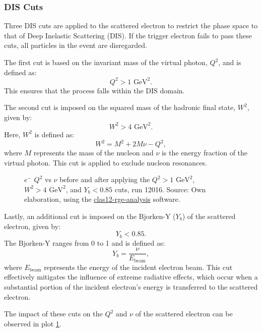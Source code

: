 \subsubsection{DIS Cuts}
\label{13.23::dis_cuts}
    Three DIS cuts are applied to the scattered electron to restrict the phase space to that of Deep Inelastic Scattering (DIS).
    If the trigger electron fails to pass these cuts, all particles in the event are disregarded.

    The first cut is based on the invariant mass of the virtual photon, $Q^2$, and is defined as:
    \begin{equation*}
        Q^2 > 1 \text{ GeV}^2.
    \end{equation*}
    This ensures that the process falls within the DIS domain.

    The second cut is imposed on the squared mass of the hadronic final state, $W^2$, given by:
    \begin{equation*}
        W^2 > 4 \text{ GeV}^2.
    \end{equation*}
    Here, $W^2$ is defined as:
    \begin{equation*}
        W^2 = M^2 + 2M\nu - Q^2,
    \end{equation*}
    where $M$ represents the mass of the nucleon and $\nu$ is the energy fraction of the virtual photon.
    This cut is applied to exclude nucleon resonances.

    \begin{figure}[b!]
        \centering{}
        \caption[$Q^2$ vs $\nu$ comparison]{$e^-$ $Q^2$ vs $\nu$ before and after applying the $Q^2 > 1 \text{ GeV}^2$, $W^2 > 4 \text{ GeV}^2$, and $Y_b < 0.85$ cuts, run 12016.
        Source: Own elaboration, using the \hyperlink{github.com/bleaktwig/clas12-rge-analysis}{clas12-rge-analysis} software.}
        \label{fig::13.23::q2_vs_nu}
    \end{figure}

    Lastly, an additional cut is imposed on the Bjorken-Y ($Y_b$) of the scattered electron, given by:
    \begin{equation*}
        Y_b < 0.85.
    \end{equation*}
    The Bjorken-Y ranges from 0 to 1 and is defined as:
    \begin{equation*}
        Y_b = \frac{\nu}{E_\text{beam}},
    \end{equation*}
    where $E_\text{beam}$ represents the energy of the incident electron beam.
    This cut effectively mitigates the influence of extreme radiative effects, which occur when a substantial portion of the incident electron's energy is transferred to the scattered electron.

    The impact of these cuts on the $Q^2$ and $\nu$ of the scattered electron can be observed in plot \ref{fig::13.23::q2_vs_nu}.
